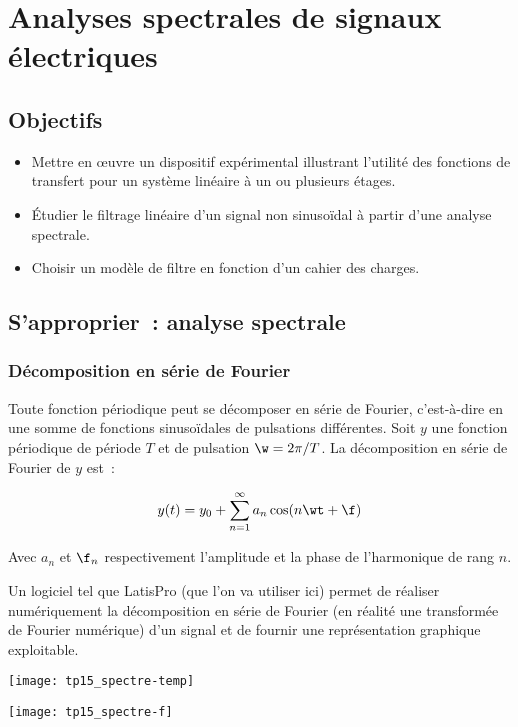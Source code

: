 \documentclass[a4paper, 11pt, final, garamond]{book}
\begin{document}
\setcounter{chapter}{14}

\chapter{Analyses spectrales de signaux \'electriques}

\section{Objectifs}

\begin{itemize} 
    \item Mettre en œuvre un dispositif expérimental illustrant l'utilité des
        fonctions de transfert pour  un système linéaire à un ou plusieurs
        étages.
    \item Étudier le filtrage linéaire d'un signal non  sinusoïdal à partir
        d'une analyse spectrale.
    \item Choisir un modèle de filtre en fonction d'un cahier des charges. 
\end{itemize}
 	
\section{S'approprier~: analyse spectrale}

\subsection{Décomposition en série de Fourier}

Toute fonction périodique peut se décomposer en série de Fourier, c'est-à-dire
en une somme de fonctions sinusoïdales de pulsations différentes. Soit $y$ une
fonction périodique de période $T$ et de pulsation $\w = 2\pi/T$. La
décomposition en série de Fourier de $y$ est~:

\[
    y(t) = y_0 + \sum_{n=1}^{\infty} a_n \cos(n\wt + \f)
\]

Avec $a_n$ et $\f_n$ respectivement l'amplitude et la phase de l'harmonique de
rang $n$.

Un logiciel tel que LatisPro (que l'on va utiliser ici) permet de réaliser
numériquement la décomposition en série de Fourier (en réalité une transformée
de Fourier numérique) d'un signal et de fournir une représentation graphique
exploitable.

\begin{minipage}{0.48\linewidth}
    \begin{center}
        \texttt{[image: tp15\_spectre-temp]}
    \end{center}
\end{minipage}
\hfill
\begin{minipage}{0.48\linewidth}
    \begin{center}
        \texttt{[image: tp15\_spectre-f]}
    \end{center}
\end{minipage}
\end{document}
